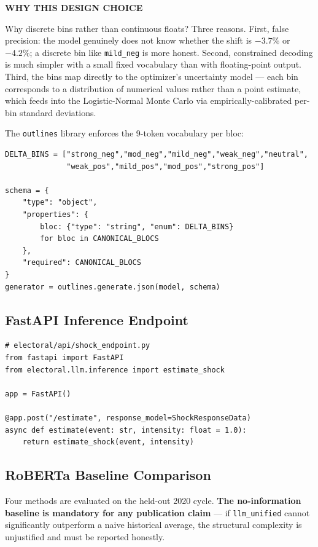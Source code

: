 \documentclass[11pt]{article}
\newcommand{\whybox}[1]{%
  \begin{mdframed}[style=whybox]
  {\small\bfseries\color{greenfg}WHY THIS DESIGN CHOICE}\par\smallskip #1
  \end{mdframed}}
\begin{document}
\whybox{
Why discrete bins rather than continuous floats? Three reasons. First,
false precision: the model genuinely does not know whether the shift is $-3.7\%$
or $-4.2\%$; a discrete bin like \texttt{mild\_neg} is more honest. Second,
constrained decoding is much simpler with a small fixed vocabulary than with
floating-point output. Third, the bins map directly to the optimizer's uncertainty
model --- each bin corresponds to a distribution of numerical values rather than a
point estimate, which feeds into the Logistic-Normal Monte Carlo via empirically-calibrated per-bin standard deviations.
}

The \texttt{outlines} library enforces the 9-token vocabulary per bloc:
\begin{lstlisting}
DELTA_BINS = ["strong_neg","mod_neg","mild_neg","weak_neg","neutral",
              "weak_pos","mild_pos","mod_pos","strong_pos"]

schema = {
    "type": "object",
    "properties": {
        bloc: {"type": "string", "enum": DELTA_BINS}
        for bloc in CANONICAL_BLOCS
    },
    "required": CANONICAL_BLOCS
}
generator = outlines.generate.json(model, schema)
\end{lstlisting}

\subsection*{FastAPI Inference Endpoint}

\begin{lstlisting}
# electoral/api/shock_endpoint.py
from fastapi import FastAPI
from electoral.llm.inference import estimate_shock

app = FastAPI()

@app.post("/estimate", response_model=ShockResponseData)
async def estimate(event: str, intensity: float = 1.0):
    return estimate_shock(event, intensity)
\end{lstlisting}

\subsection*{RoBERTa Baseline Comparison}

Four methods are evaluated on the held-out 2020 cycle. \textbf{The no-information
baseline is mandatory for any publication claim} --- if \texttt{llm\_unified} cannot
significantly outperform a naive historical average, the structural complexity is
unjustified and must be reported honestly.
\end{document}

